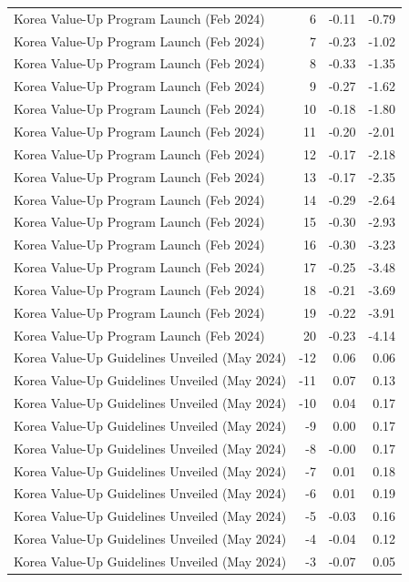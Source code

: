 \begin{table}
\begin{tabular}{lrrr}
Korea Value-Up Program Launch (Feb 2024) & 6 & -0.11 & -0.79 \\
Korea Value-Up Program Launch (Feb 2024) & 7 & -0.23 & -1.02 \\
Korea Value-Up Program Launch (Feb 2024) & 8 & -0.33 & -1.35 \\
Korea Value-Up Program Launch (Feb 2024) & 9 & -0.27 & -1.62 \\
Korea Value-Up Program Launch (Feb 2024) & 10 & -0.18 & -1.80 \\
Korea Value-Up Program Launch (Feb 2024) & 11 & -0.20 & -2.01 \\
Korea Value-Up Program Launch (Feb 2024) & 12 & -0.17 & -2.18 \\
Korea Value-Up Program Launch (Feb 2024) & 13 & -0.17 & -2.35 \\
Korea Value-Up Program Launch (Feb 2024) & 14 & -0.29 & -2.64 \\
Korea Value-Up Program Launch (Feb 2024) & 15 & -0.30 & -2.93 \\
Korea Value-Up Program Launch (Feb 2024) & 16 & -0.30 & -3.23 \\
Korea Value-Up Program Launch (Feb 2024) & 17 & -0.25 & -3.48 \\
Korea Value-Up Program Launch (Feb 2024) & 18 & -0.21 & -3.69 \\
Korea Value-Up Program Launch (Feb 2024) & 19 & -0.22 & -3.91 \\
Korea Value-Up Program Launch (Feb 2024) & 20 & -0.23 & -4.14 \\
Korea Value-Up Guidelines Unveiled (May 2024) & -12 & 0.06 & 0.06 \\
Korea Value-Up Guidelines Unveiled (May 2024) & -11 & 0.07 & 0.13 \\
Korea Value-Up Guidelines Unveiled (May 2024) & -10 & 0.04 & 0.17 \\
Korea Value-Up Guidelines Unveiled (May 2024) & -9 & 0.00 & 0.17 \\
Korea Value-Up Guidelines Unveiled (May 2024) & -8 & -0.00 & 0.17 \\
Korea Value-Up Guidelines Unveiled (May 2024) & -7 & 0.01 & 0.18 \\
Korea Value-Up Guidelines Unveiled (May 2024) & -6 & 0.01 & 0.19 \\
Korea Value-Up Guidelines Unveiled (May 2024) & -5 & -0.03 & 0.16 \\
Korea Value-Up Guidelines Unveiled (May 2024) & -4 & -0.04 & 0.12 \\
Korea Value-Up Guidelines Unveiled (May 2024) & -3 & -0.07 & 0.05 \\

\end{tabular}
\end{table}
